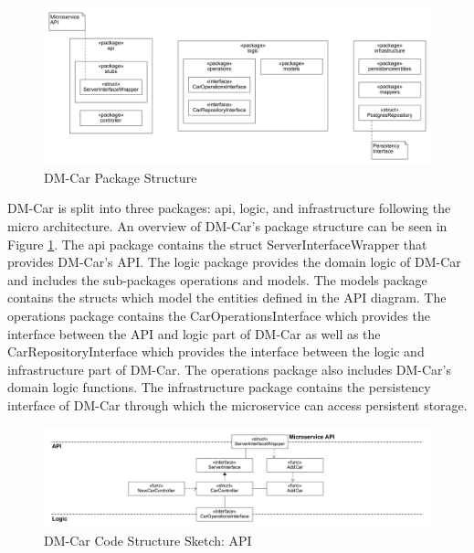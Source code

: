 \begin{figure}[tb]
	\centering
	\includegraphics[width=\textwidth]{figures/8.6_dm_car_package_structure.png}
	\caption{DM-Car Package Structure}
	\label{fig:dm_car_package_structure}
\end{figure}

DM-Car is split into three packages: api, logic, and infrastructure following
the micro architecture. An overview of DM-Car's package structure can be
seen in Figure \ref{fig:dm_car_package_structure}. The api package contains the
struct ServerInterfaceWrapper that provides DM-Car's API.
The logic package provides the domain logic of DM-Car and includes the sub-packages
operations and models. The models package contains the structs
which model the entities defined in the API diagram. The operations
package contains the CarOperationsInterface which provides the interface
between the API and logic part of DM-Car as well as the CarRepositoryInterface
which provides the interface between the logic and infrastructure part of DM-Car.
The operations package also includes DM-Car's domain logic functions.
The infrastructure package contains the persistency interface of DM-Car through which the
microservice can access persistent storage.

\begin{figure}[tb]
	\centering
	\includegraphics[width=\textwidth]{figures/8.7_dm_car_css_api.png}
	\caption{DM-Car Code Structure Sketch: API}
	\label{fig:dm_car_css_api}
\end{figure}

